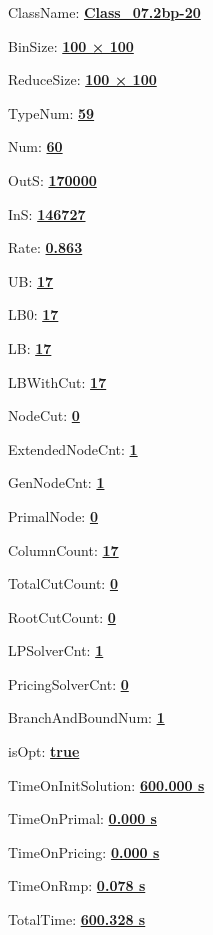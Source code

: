\documentclass[11pt]{article}
\begin{document}
\pagestyle{empty}


ClassName: \underline{\textbf{Class_07.2bp-20}}
\par
BinSize: \underline{\textbf{100 × 100}}
\par
ReduceSize: \underline{\textbf{100 × 100}}
\par
TypeNum: \underline{\textbf{59}}
\par
Num: \underline{\textbf{60}}
\par
OutS: \underline{\textbf{170000}}
\par
InS: \underline{\textbf{146727}}
\par
Rate: \underline{\textbf{0.863}}
\par
UB: \underline{\textbf{17}}
\par
LB0: \underline{\textbf{17}}
\par
LB: \underline{\textbf{17}}
\par
LBWithCut: \underline{\textbf{17}}
\par
NodeCut: \underline{\textbf{0}}
\par
ExtendedNodeCnt: \underline{\textbf{1}}
\par
GenNodeCnt: \underline{\textbf{1}}
\par
PrimalNode: \underline{\textbf{0}}
\par
ColumnCount: \underline{\textbf{17}}
\par
TotalCutCount: \underline{\textbf{0}}
\par
RootCutCount: \underline{\textbf{0}}
\par
LPSolverCnt: \underline{\textbf{1}}
\par
PricingSolverCnt: \underline{\textbf{0}}
\par
BranchAndBoundNum: \underline{\textbf{1}}
\par
isOpt: \underline{\textbf{true}}
\par
TimeOnInitSolution: \underline{\textbf{600.000 s}}
\par
TimeOnPrimal: \underline{\textbf{0.000 s}}
\par
TimeOnPricing: \underline{\textbf{0.000 s}}
\par
TimeOnRmp: \underline{\textbf{0.078 s}}
\par
TotalTime: \underline{\textbf{600.328 s}}
\par
\newpage


\end{document}
